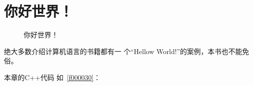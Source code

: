 ﻿





\FloatBarrier
\section{
你好世界！
}\label{s100410}


\begin{figure}[htb] %
\marginnote{\setlength\fboxsep{2pt}\fbox{\footnotesize{\kaishu\figurename\,}\footnotesize{\ref{p000006}}}}\centering %
\setlength\fboxsep{0pt} %
\caption{你好世界！} %
\label{p000006} %
\end{figure}


绝大多数介绍计算机语言的书籍都有一
个“Hellow World!”的案例，本书也不能免俗。

本章的C{\sourcefonttwo{}+}{\sourcefonttwo{}+}代码
如\filesourcenumbernameone\ \ref{f000030}：

